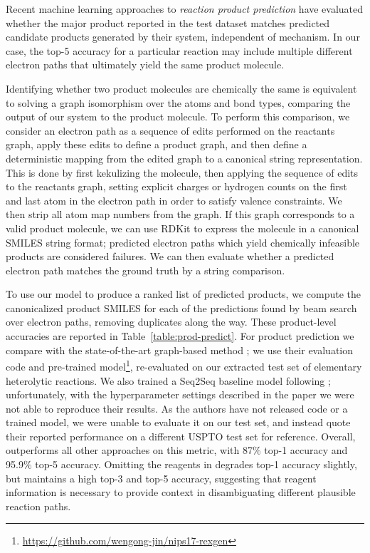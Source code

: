 Recent machine learning approaches to {\em reaction product prediction} \citep{jin2017predicting,schwaller2017found}
have evaluated whether the major product reported in the test dataset matches predicted candidate products generated by their system, independent of mechanism.
In our case, the top-5 accuracy for a particular reaction may include multiple different electron paths that ultimately yield the same product molecule.

Identifying whether two product molecules are chemically the same is equivalent to solving a graph isomorphism over the atoms and bond types, comparing the output of our system to the product molecule.
To perform this comparison, we consider an electron path as a sequence of edits performed on the reactants graph, apply these edits to define a product graph, 
and then define a deterministic mapping from the edited graph to a canonical string representation.
This is done by first kekulizing the molecule, %
then applying the sequence of edits to the reactants graph,
setting explicit charges or hydrogen counts on the first and last atom in the electron path in order to satisfy valence constraints.
We then strip all atom map numbers from the graph.
If this graph corresponds to a valid product molecule, we can use RDKit to express the molecule in a canonical SMILES string format;
predicted electron paths which yield chemically infeasible products are considered failures.
We can then evaluate whether a predicted electron path matches the ground truth by a string comparison.

To use our model to produce a ranked list of predicted products, we compute the canonicalized product SMILES for each of the predictions found by beam search over electron paths, removing duplicates along the way. 
These product-level accuracies are reported in Table~\ref{table:prod-predict}.
For product prediction we compare with the state-of-the-art graph-based method \cite{jin2017predicting};
we use their evaluation code and pre-trained model\footnote{\url{https://github.com/wengong-jin/nips17-rexgen}},
re-evaluated on our extracted test set of elementary heterolytic reactions.
We also trained a Seq2Seq baseline model following \cite{schwaller2017found};
unfortunately, with the hyperparameter settings described in the paper we were not able to reproduce their results.
As the authors have not released code or a trained model, we were unable to evaluate it on our test set, and instead quote their reported performance on a different USPTO test set for reference.
Overall, \ourModelR outperforms all other approaches on this metric, with 87\% top-1 accuracy and 95.9\% top-5 accuracy.
Omitting the reagents in \ourModelR degrades top-1 accuracy slightly, but maintains a high top-3 and top-5 accuracy,
suggesting that reagent information is necessary to provide context in disambiguating different plausible reaction paths.



